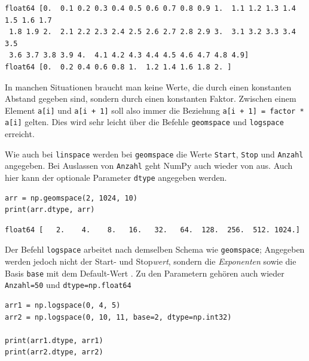 \begin{cmdbox}
\begin{verbatim}
float64 [0.  0.1 0.2 0.3 0.4 0.5 0.6 0.7 0.8 0.9 1.  1.1 1.2 1.3 1.4 1.5 1.6 1.7
 1.8 1.9 2.  2.1 2.2 2.3 2.4 2.5 2.6 2.7 2.8 2.9 3.  3.1 3.2 3.3 3.4 3.5
 3.6 3.7 3.8 3.9 4.  4.1 4.2 4.3 4.4 4.5 4.6 4.7 4.8 4.9]
float64 [0.  0.2 0.4 0.6 0.8 1.  1.2 1.4 1.6 1.8 2. ]
\end{verbatim}
\end{cmdbox}

In manchen Situationen braucht man keine Werte, die durch einen konstanten Abstand gegeben sind, sondern durch einen konstanten Faktor. Zwischen einem Element \texttt{a[i]} und \texttt{a[i + 1]} soll also immer die Beziehung \texttt{a[i + 1] = factor * a[i]} gelten. Dies wird sehr leicht über die Befehle \texttt{geomspace} und \texttt{logspace} erreicht.

Wie auch bei \texttt{linspace} werden bei \texttt{geomspace} die Werte \texttt{Start}, \texttt{Stop} und \texttt{Anzahl} angegeben. Bei Auslassen von \texttt{Anzahl} geht NumPy auch wieder von  aus. Auch hier kann der optionale Parameter \texttt{dtype} angegeben werden.

\begin{codebox}
\begin{verbatim}
arr = np.geomspace(2, 1024, 10)
print(arr.dtype, arr)
\end{verbatim}
\end{codebox}

\begin{cmdbox}
\begin{verbatim}
float64 [   2.    4.    8.   16.   32.   64.  128.  256.  512. 1024.]
\end{verbatim}
\end{cmdbox}

Der Befehl \texttt{logspace} arbeitet nach demselben Schema wie \texttt{geomspace}; Angegeben werden jedoch nicht der Start- und Stop\emph{wert}, sondern die \emph{Exponenten} sowie die Basis \texttt{base} mit dem Default-Wert . Zu den Parametern gehören auch wieder \texttt{Anzahl=50} und \texttt{dtype=np.float64}

\begin{codebox}
\begin{verbatim}
arr1 = np.logspace(0, 4, 5)
arr2 = np.logspace(0, 10, 11, base=2, dtype=np.int32)

print(arr1.dtype, arr1)
print(arr2.dtype, arr2)
\end{verbatim}
\end{codebox}

